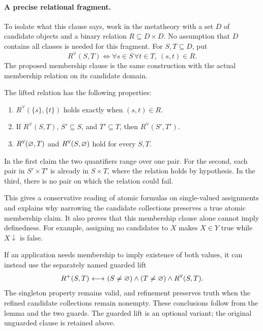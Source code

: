 \paragraph{A precise relational fragment.}
To isolate what this clause says, work in the metatheory with a set $D$ of
candidate objects and a binary relation $R\subseteq D\times D$. No
assumption that $D$ contains all classes is needed for this fragment. For
$S,T\subseteq D$, put
\[
R^{\forall}(S,T)\iff
\forall s\in S\,\forall t\in T,\ (s,t)\in R.
\]
The proposed membership clause is the same construction with the actual
membership relation on its candidate domain.

\begin{lemma}
The lifted relation has the following properties:
\begin{enumerate}
\item $R^{\forall}(\{s\},\{t\})$ holds exactly when $(s,t)\in R$.
\item If $R^{\forall}(S,T)$, $S'\subseteq S$, and $T'\subseteq T$, then
  $R^{\forall}(S',T')$.
\item $R^{\forall}(\varnothing,T)$ and
  $R^{\forall}(S,\varnothing)$ hold for every $S,T$.
\end{enumerate}
\end{lemma}
\Proof
In the first claim the two quantifiers range over one pair. For the second,
each pair in $S'\times T'$ is already in $S\times T$, where the relation
holds by hypothesis. In the third, there is no pair on which the relation
could fail.
\Done

This gives a conservative reading of atomic formulas on single-valued
assignments and explains why narrowing the candidate collections preserves
a true atomic membership claim. It also proves that this membership clause
alone cannot imply definedness. For example, assigning no candidates to
$X$ makes $X\in Y$ true while $X\downarrow$ is false.

If an application needs membership to imply existence of both values, it
can instead use the separately named guarded lift
\[
R^+(S,T){\ \longleftrightarrow\ }
(S\neq\varnothing)\land(T\neq\varnothing)\land R^{\forall}(S,T).
\]
The singleton property remains valid, and refinement preserves truth when
the refined candidate collections remain nonempty. These conclusions follow
from the lemma and the two guards. The guarded lift is an optional variant;
the original unguarded clause is retained above.

